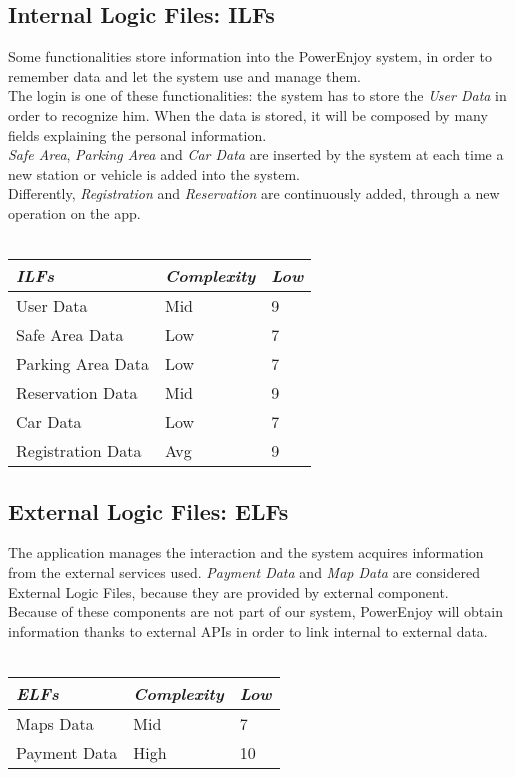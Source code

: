 \documentclass[11pt,a4paper]{report}
\begin{document}
\subsection{Internal Logic Files: ILFs}
Some functionalities store information into the PowerEnjoy system, in order to remember data and let the system use and manage them.\\
The login is one of these functionalities: the system has to store the \textit{User Data} in order to recognize him. When the data is stored, it will be composed by many fields explaining the personal information.\\
\textit{Safe Area}, \textit{Parking Area} and \textit{Car Data} are inserted by the system at each time a new station or vehicle is added into the system.\\
Differently, \textit{Registration} and \textit{Reservation} are continuously added, through a new operation on the app.
\\\\
\begin{tabularx}{\textwidth}{|X|X|X|}
	\hline
	\textit{ILFs} & \textit{Complexity} & \textit{Low}\\
	\hline
	User Data & Mid & 9\\
	Safe Area Data & Low & 7\\
	Parking Area Data & Low & 7\\
	Reservation Data & Mid & 9\\
	Car Data & Low & 7\\
	Registration Data & Avg & 9\\
	\hline
\end{tabularx}
\subsection{External Logic Files: ELFs}
The application manages the interaction and the system acquires information from the external services used.
\textit{Payment Data} and \textit{Map Data} are considered External Logic Files, because they are provided by external component.\\
Because of these components are not part of our system, PowerEnjoy will obtain information thanks to external APIs in order to link internal to external data.\\\\ 
\begin{tabularx}{\textwidth}{|X|X|X|}
	\hline
	\textit{ELFs} & \textit{Complexity} & \textit{Low}\\
	\hline
	Maps Data & Mid & 7\\
	Payment Data & High & 10\\
	\hline
\end{tabularx}
\end{document}
